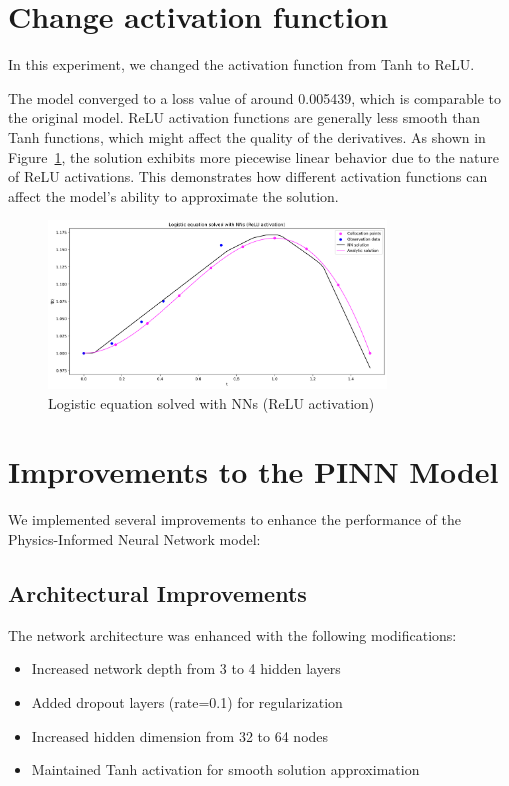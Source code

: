 \documentclass[11pt,a4paper]{article}
\begin{document}
\section{Change activation function}
In this experiment, we changed the activation function from Tanh to ReLU.

The model converged to a loss value of around 0.005439, which is comparable to the original model. ReLU activation functions are generally less smooth than Tanh functions, which might affect the quality of the derivatives. As shown in Figure~\ref{fig:relu}, the solution exhibits more piecewise linear behavior due to the nature of ReLU activations. This demonstrates how different activation functions can affect the model's ability to approximate the solution.

\begin{figure}[h]
    \centering
    \includegraphics[width=0.8\textwidth]{figures/pinn_task4_relu.png}
    \caption{Logistic equation solved with NNs (ReLU activation)}
    \label{fig:relu}
\end{figure}

\section{Improvements to the PINN Model}

We implemented several improvements to enhance the performance of the Physics-Informed Neural Network model:

\subsection{Architectural Improvements}
The network architecture was enhanced with the following modifications:
\begin{itemize}
    \item Increased network depth from 3 to 4 hidden layers
    \item Added dropout layers (rate=0.1) for regularization
    \item Increased hidden dimension from 32 to 64 nodes
    \item Maintained Tanh activation for smooth solution approximation
\end{itemize}
\end{document}
